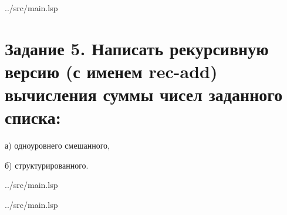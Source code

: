 \begin{lstinputlisting}[
	caption={Задание 4},
	label={lst:t4},
	style={lsp},
	linerange={39-49},
	]{../src/main.lsp}
\end{lstinputlisting}

\section*{Задание 5. Написать рекурсивную версию (с именем rec-add) вычисления суммы чисел заданного списка:}
а) одноуровнего смешанного,

б) структурированного.

\begin{lstinputlisting}[
	caption={Задание 5, a},
	label={lst:t5-1},
	style={lsp},
	linerange={51-57},
	]{../src/main.lsp}
\end{lstinputlisting}

\begin{lstinputlisting}[
	caption={Задание 5, б},
	label={lst:t5-2},
	style={lsp},
	linerange={59-66},
	]{../src/main.lsp}
\end{lstinputlisting}





